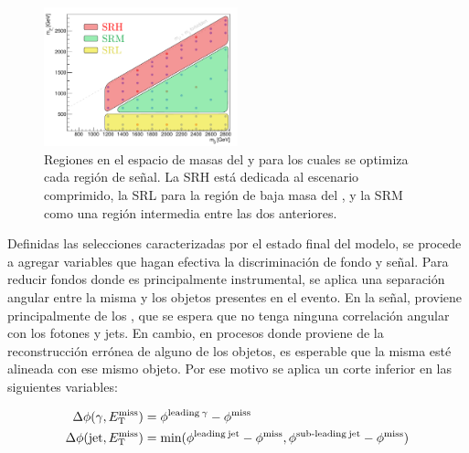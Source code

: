 \begin{figure}[ht!]
  \centering
  \includegraphics[width=0.5\textwidth]{images/analysis/sr_design.pdf}
  \caption{Regiones en el espacio de masas del \gluino y \ninoone para los cuales se optimiza cada región de señal. La SRH está dedicada al escenario comprimido, la SRL para la región de baja masa del \ninoone, y la SRM como una región intermedia entre las dos anteriores.}
  \label{fig:sr_design}
\end{figure}


Definidas las selecciones caracterizadas por el estado final del modelo, se procede a agregar variables que hagan efectiva la discriminación de fondo y señal. Para reducir fondos donde \met es principalmente instrumental, se aplica una separación angular entre la misma y los objetos presentes en el evento. En la señal, \met proviene principalmente de los \gravino, que se espera que no tenga ninguna correlación angular con los fotones y jets. En cambio, en procesos donde \met proviene de la reconstrucción errónea de alguno de los objetos, es esperable que la misma esté alineada con ese mismo objeto. Por ese motivo se aplica un corte inferior en las siguientes variables:

\begin{equation}
  \begin{split}
  \Delta\phi(\gamma, E_{\text{T}}^{\text{miss}}) & = \phi^{\text{leading}\: \gamma} - \phi^{\text{miss}} \\
  \Delta\phi(\text{jet}, E_{\text{T}}^{\text{miss}}) & = \text{min}(\phi^{\text{leading}\: \text{jet}} - \phi^{\text{miss}}, \phi^{\text{sub-leading}\: \text{jet}} - \phi^{\text{miss}}) \\
  \end{split}
\end{equation}

